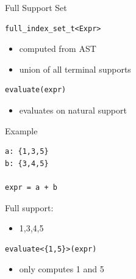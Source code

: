\documentclass{beamer}
\begin{document}

\begin{frame}[fragile]{Full Support Set}
\begin{lstlisting}
full_index_set_t<Expr>
\end{lstlisting}

\vspace{1em}

\begin{itemize}
\item computed from AST
\item union of all terminal supports
\end{itemize}

\vspace{1em}

\begin{lstlisting}
evaluate(expr)
\end{lstlisting}

\vspace{1em}

\begin{itemize}
\item evaluates on natural support
\end{itemize}

\end{frame}


\begin{frame}[fragile]{Example}
\begin{lstlisting}
a: {1,3,5}
b: {3,4,5}

expr = a + b
\end{lstlisting}

\vspace{1em}

Full support:

\begin{itemize}
\item {1,3,4,5}
\end{itemize}

\vspace{1em}

\begin{lstlisting}
evaluate<{1,5}>(expr)
\end{lstlisting}

\begin{itemize}
\item only computes 1 and 5
\end{itemize}

\end{frame}
\end{document}

